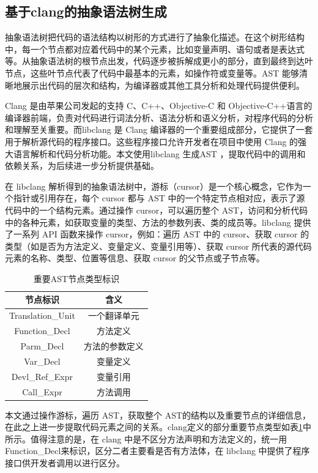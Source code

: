 \subsection{基于clang的抽象语法树生成}
抽象语法树把代码的语法结构以树形的方式进行了抽象化描述。在这个树形结构中，每一个节点都对应着代码中的某个元素，比如变量声明、语句或者是表达式等。从抽象语法树的根节点出发，代码逐步被拆解成更小的部分，直到最终到达叶节点，这些叶节点代表了代码中最基本的元素，如操作符或变量等。AST 能够清晰地展示出代码的层次和结构，为编译器或其他工具分析和处理代码提供便利。


Clang 是由苹果公司发起的支持 C、C++、Objective-C 和 Objective-C++语言的编译器前端，负责对代码进行词法分析、语法分析和语义分析，对程序代码的分析和理解至关重要\cite{clang}。而libclang 是 Clang 编译器的一个重要组成部分，它提供了一套用于解析源代码的程序接口。这些程序接口允许开发者在项目中使用 Clang 的强大语言解析和代码分析功能\cite{libclang}。本文使用libclang 生成AST ，提取代码中的调用和依赖关系，为后续进一步分析提供基础。

在 libclang 解析得到的抽象语法树中，游标（cursor）是一个核心概念，它作为一个指针或引用存在，每个 cursor 都与 AST 中的一个特定节点相对应，表示了源代码中的一个结构元素。通过操作 cursor，可以遍历整个 AST，访问和分析代码中的各种元素，如获取变量的类型、方法的参数列表、类的成员等。libclang 提供了一系列 API 函数来操作 cursor，例如：遍历 AST 中的 cursor、获取 cursor 的类型（如是否为方法定义、变量定义、变量引用等）、获取 cursor 所代表的源代码元素的名称、类型、位置等信息、获取 cursor 的父节点或子节点等。

\begin{table}[htbp]
\caption{重要AST节点类型标识}
\label{1_重要AST节点类型标识}
\vspace{0.5em}\centering\wuhao
\begin{tabular}{cc}
\toprule
节点标识 & 含义  \\
\midrule
Translation\_Unit & 一个翻译单元 \\
Function\_Decl  & 方法定义 \\
Parm\_Decl & 方法的参数定义 \\
Var\_Decl & 变量定义 \\ 
Devl\_Ref\_Expr  & 变量引用  \\
Call\_Expr  & 方法调用  \\
\bottomrule
\end{tabular}
\end{table}   

本文通过操作游标，遍历 AST，获取整个 AST的结构以及重要节点的详细信息，在此之上进一步提取代码元素之间的关系。clang定义的部分重要节点类型如表\ref{1_重要AST节点类型标识}中所示。值得注意的是，在 clang 中是不区分方法声明和方法定义的，统一用 Function\_Decl来标识，区分二者主要看是否有方法体，在 libclang 中提供了程序接口供开发者调用以进行区分。

